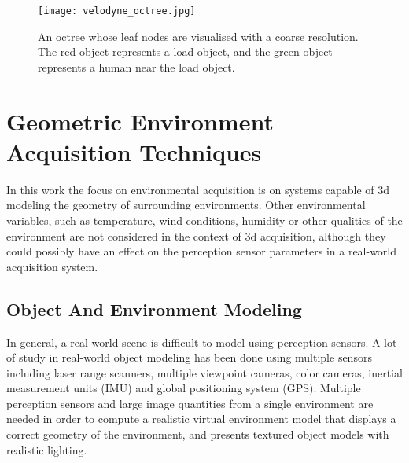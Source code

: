 \documentclass[12pt,a4paper,oneside,pdftex]{report}
\begin{document}
\begin{figure}[ht]
  \begin{center}
    \texttt{[image: velodyne\_octree.jpg]}
    \caption{An octree whose leaf nodes are visualised with a coarse resolution. The red object represents a load object, and the green object represents a human near the load object.}
    \label{fig:velodyne_octree}
  \end{center}
\end{figure}

\section{Geometric Environment Acquisition Techniques}
\label{section:environment_acquisition_techniques}

In this work the focus on environmental acquisition is on systems capable of 3d modeling the geometry of surrounding environments. Other environmental variables, such as temperature, wind conditions, humidity or other qualities of the environment are not considered in the context of 3d acquisition, although they could possibly have an effect on the perception sensor parameters in a real-world acquisition system. 

\subsection{Object And Environment Modeling}
\label{subsection:object_and_environment_modeling}

In general, a real-world scene is difficult to model using perception sensors. A lot of study in real-world object modeling has been done using multiple sensors including laser range scanners, multiple viewpoint cameras, color cameras, inertial measurement units (IMU) and global positioning system (GPS). Multiple perception sensors and large image quantities from a single environment are needed in order to compute a realistic virtual environment model that displays a correct geometry of the environment, and presents textured object models with realistic lighting. \citep{ElHakim98}
\end{document}
